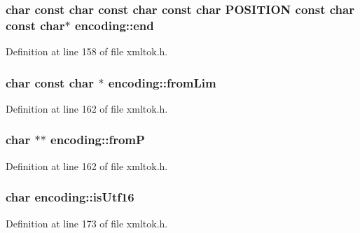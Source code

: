 \subsubsection[{\texorpdfstring{end}{end}}]{ char {\bf const} char {\bf const} char {\bf const} char {\bf P\+O\+S\+I\+T\+I\+ON} {\bf const} char {\bf const} char$\ast$ encoding\+::end}\hypertarget{structencoding_a049c4d9fc04216e6368851a75c7dd414}{}\label{structencoding_a049c4d9fc04216e6368851a75c7dd414}


Definition at line 158 of file xmltok.\+h.

\subsubsection[{\texorpdfstring{from\+Lim}{fromLim}}]{ char {\bf const} char $\ast$ encoding\+::from\+Lim}\hypertarget{structencoding_a51d2a830b3a5f30129f7140209e6800f}{}\label{structencoding_a51d2a830b3a5f30129f7140209e6800f}


Definition at line 162 of file xmltok.\+h.

\subsubsection[{\texorpdfstring{fromP}{fromP}}]{ char $\ast$$\ast$ encoding\+::fromP}\hypertarget{structencoding_a360cf1537ca9bd86b123b8b323fe8433}{}\label{structencoding_a360cf1537ca9bd86b123b8b323fe8433}


Definition at line 162 of file xmltok.\+h.

\subsubsection[{\texorpdfstring{is\+Utf16}{isUtf16}}]{\setlength{\rightskip}{0pt plus 5cm}char encoding\+::is\+Utf16}\hypertarget{structencoding_a6990f83527cc7262bb17809aab156a9e}{}\label{structencoding_a6990f83527cc7262bb17809aab156a9e}


Definition at line 173 of file xmltok.\+h.

